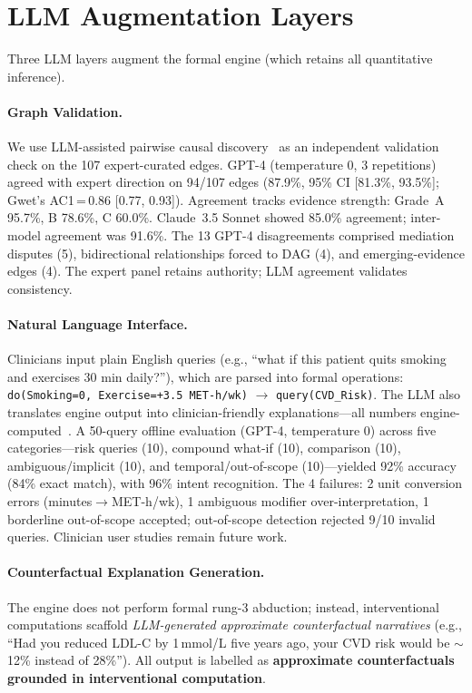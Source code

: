 \documentclass[runningheads]{llncs}
\begin{document}
\section{LLM Augmentation Layers}\label{sec:llm}

Three LLM layers augment the formal engine (which retains all
quantitative inference).

\paragraph{Graph Validation.}\label{sec:llmvalidation}
We use LLM-assisted pairwise causal
discovery~\cite{kiciman2023causal} as an independent validation
check on the 107 expert-curated edges.
GPT-4 (temperature 0, 3 repetitions) agreed with expert direction
on 94/107 edges (87.9\%, 95\% CI [81.3\%, 93.5\%]; Gwet's
AC1\,=\,0.86 [0.77, 0.93]).
Agreement tracks evidence strength: Grade~A 95.7\%, B 78.6\%,
C 60.0\%.
Claude~3.5 Sonnet showed 85.0\% agreement; inter-model agreement
was 91.6\%.
The 13 GPT-4 disagreements comprised mediation disputes (5),
bidirectional relationships forced to DAG (4), and emerging-evidence
edges (4).
The expert panel retains authority; LLM agreement validates
consistency.

\paragraph{Natural Language Interface.}\label{sec:llminterface}
Clinicians input plain English queries (e.g., ``what if this
patient quits smoking and exercises 30 min daily?''), which are
parsed into formal operations:
\texttt{do(Smoking=0, Exercise=+3.5 MET-h/wk)} $\to$
\texttt{query(CVD\_Risk)}.
The LLM also translates engine output into clinician-friendly
explanations---all numbers engine-computed~\cite{jin2023cladder}.
A 50-query offline evaluation (GPT-4, temperature 0) across five
categories---risk queries (10), compound what-if (10), comparison
(10), ambiguous/implicit (10), and temporal/out-of-scope
(10)---yielded 92\% accuracy (84\% exact match), with 96\% intent
recognition.
The 4 failures: 2 unit conversion errors (minutes$\to$MET-h/wk),
1 ambiguous modifier over-interpretation, 1 borderline out-of-scope
accepted; out-of-scope detection rejected 9/10 invalid queries.
Clinician user studies remain future work.

\paragraph{Counterfactual Explanation Generation.}\label{sec:counterfactual}
The engine does not perform formal rung-3 abduction; instead,
interventional computations scaffold \emph{LLM-generated approximate
counterfactual narratives} (e.g., ``Had you reduced LDL-C by
1\,mmol/L five years ago, your CVD risk would be ${\sim}$12\%
instead of 28\%'').
All output is labelled as \textbf{approximate counterfactuals
grounded in interventional computation}.
\end{document}
